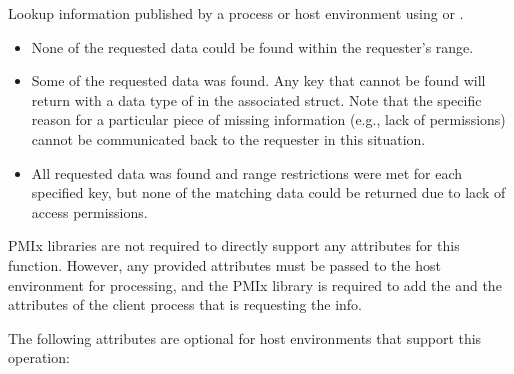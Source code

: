 Lookup information published by a process or host environment using  or .

\format


\begin{arglist}
\end{arglist}

\returnstart
\begin{itemize}
\item {} None of the requested data could be found within the requester's range.

\item {} Some of the requested data was found.
Any key that cannot be found will return with a data type of  in the associated  struct. Note that the specific reason for a particular piece of missing information (e.g., lack of permissions) cannot be communicated back to the requester in this situation.

\item {} All requested data was found and range restrictions were met for each specified key, but none of the matching data could be returned due to lack of access permissions.

\end{itemize}
\returnend

\reqattrstart
\ac{PMIx} libraries are not required to directly support any attributes for this function. However, any provided attributes must be passed to the host environment for processing, and the \ac{PMIx} library is required to add the  and the  attributes of the client process that is requesting the info.

\reqattrend

\optattrstart
The following attributes are optional for host environments that support this operation:

